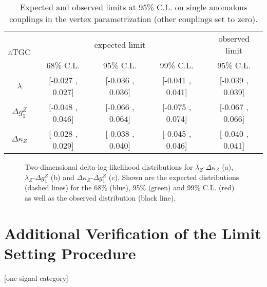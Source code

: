\begin{table}
	\centering
	\caption[Expected and observed limits at 95\% C.L. on single anomalous couplings in the vertex parametrization]{Expected and observed limits at 95\% C.L. on single anomalous couplings in the vertex parametrization (other couplings set to zero).}
	\label{tab:limits:1dlimits_vertex}
	\begin{tabular}{ccccc}
	\hline
	\multirow{2}{*}{aTGC}              &     \multicolumn{3}{c}{expected limit} & observed limit\\
	& 68\% C.L. & 95\% C.L. & 99\% C.L. & 95\% C.L.\\
	\hline
	$\lambda$ & [-0.027 , 0.027] & [-0.036 , 0.036] & [-0.041 , 0.041] & [-0.039 , 0.039] \\
	$\Delta g_1^Z$   & [-0.048 , 0.046] & [-0.066 , 0.064] & [-0.075 , 0.074] & [-0.067 , 0.066] \\
	$\Delta\kappa_Z$   & [-0.028 , 0.029] & [-0.038 , 0.040] & [-0.045 , 0.046] & [-0.040 , 0.041] \\
	\hline
	\end{tabular}
\end{table}

\begin{figure}
	\centering
	\caption[Two-dimensional delta-log-likelihood distributions for the three combinations of aTGC parameters in the vertex parametrization]{Two-dimensional delta-log-likelihood distributions for $\lambda_Z$-$\Delta\kappa_Z$ (a), $\lambda_Z$-$\Delta g_1^Z$ (b) and $\Delta\kappa_Z$-$\Delta g_1^Z$ (c). Shown are the expected distributions (dashed lines) for the 68\% (blue), 95\% (green) and 99\% C.L. (red) as well as the observed distribution (black line).}
	\label{fig:limits:2dlimitsvertex}	
\end{figure}

\section{Additional Verification of the Limit Setting Procedure}
[one signal category]

